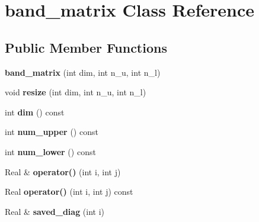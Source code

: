\hypertarget{classband__matrix}{\section{band\-\_\-matrix Class Reference}
\label{classband__matrix}
}
\subsection*{Public Member Functions}
\begin{DoxyCompactItemize}
\item 
\hypertarget{classband__matrix_a4168e9aecf418e3471bddb516d3f1862}{{\bfseries band\-\_\-matrix} (int dim, int n\-\_\-u, int n\-\_\-l)}\label{classband__matrix_a4168e9aecf418e3471bddb516d3f1862}

\item 
\hypertarget{classband__matrix_a1aa747b2d152bebd3d7840c81f1a1bd4}{void {\bfseries resize} (int dim, int n\-\_\-u, int n\-\_\-l)}\label{classband__matrix_a1aa747b2d152bebd3d7840c81f1a1bd4}

\item 
\hypertarget{classband__matrix_ad8f0937c38e99d53ef48984d5b96c770}{int {\bfseries dim} () const }\label{classband__matrix_ad8f0937c38e99d53ef48984d5b96c770}

\item 
\hypertarget{classband__matrix_afb0256e0f498b7bee7f57cfd240b6fbe}{int {\bfseries num\-\_\-upper} () const }\label{classband__matrix_afb0256e0f498b7bee7f57cfd240b6fbe}

\item 
\hypertarget{classband__matrix_a54c2f1fbc3c6e72c2db7dded8fa33b49}{int {\bfseries num\-\_\-lower} () const }\label{classband__matrix_a54c2f1fbc3c6e72c2db7dded8fa33b49}

\item 
\hypertarget{classband__matrix_aaec1dcb90de7879c78e9abd99fe1c975}{Real \& {\bfseries operator()} (int i, int j)}\label{classband__matrix_aaec1dcb90de7879c78e9abd99fe1c975}

\item 
\hypertarget{classband__matrix_a8d9d3ac39f686ff8b2dedf6903c75b45}{Real {\bfseries operator()} (int i, int j) const }\label{classband__matrix_a8d9d3ac39f686ff8b2dedf6903c75b45}

\item 
\hypertarget{classband__matrix_ab810540005fc4a28650c1df42c94bb53}{Real \& {\bfseries saved\-\_\-diag} (int i)}\label{classband__matrix_ab810540005fc4a28650c1df42c94bb53}


\end{DoxyCompactItemize}
